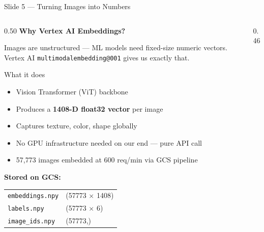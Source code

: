 \documentclass[aspectratio=169, 9pt]{beamer}
\begin{document}
\begin{frame}{Slide 5 --- Turning Images into Numbers}

  \begin{columns}[T]

    \begin{column}{0.50\textwidth}
      \textbf{\color{navyblue}Why Vertex AI Embeddings?}

      \vspace{0.4em}
      Images are unstructured --- ML models need fixed-size numeric vectors.
      Vertex AI \texttt{multimodalembedding@001} gives us exactly that.

      \vspace{0.5em}
      \begin{exampleblock}{What it does}
        \small
        \begin{itemize}[leftmargin=1em, itemsep=0pt]
          \item Vision Transformer (ViT) backbone
          \item Produces a \textbf{1408-D float32 vector} per image
          \item Captures texture, color, shape globally
          \item No GPU infrastructure needed on our end --- pure API call
          \item 57,773 images embedded at 600 req/min via GCS pipeline
        \end{itemize}
      \end{exampleblock}

      \vspace{0.5em}
      \textbf{\color{navyblue}Stored on GCS:}\\[0.3em]
      {\small
      \begin{tabular}{@{} ll @{}}
        \texttt{embeddings.npy} & (57773 $\times$ 1408) \\
        \texttt{labels.npy}     & (57773 $\times$ 6) \\
        \texttt{image\_ids.npy} & (57773,) \\
      \end{tabular}
      }
    \end{column}

    \begin{column}{0.46\textwidth}


\end{column}
\end{columns}
\end{frame}
\end{document}
